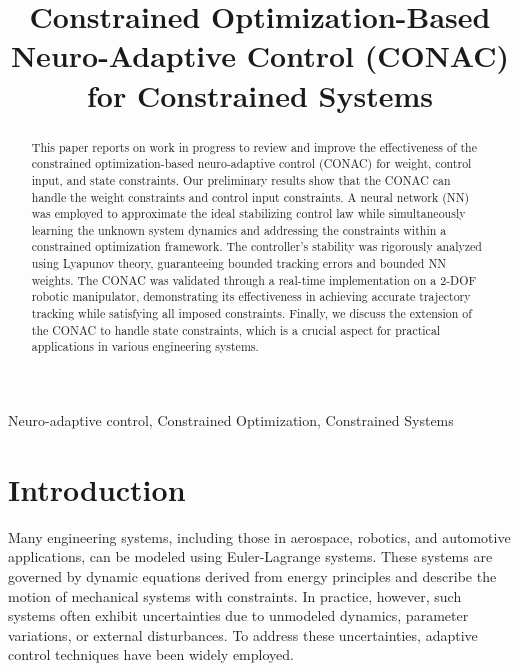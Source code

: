 \documentclass[conference]{IEEEtran}
\begin{document}
\title{\LARGE \bf
    Constrained Optimization-Based Neuro-Adaptive Control (CONAC) for Constrained Systems
}

\author{
    }


\maketitle
\thispagestyle{empty}

\begin{abstract}
    This paper reports on work in progress to review and improve the effectiveness of the constrained optimization-based neuro-adaptive control (CONAC) for weight, control input, and state constraints.
    Our preliminary results show that the CONAC can handle the weight constraints and control input constraints.
  A neural network (NN) was employed to approximate the ideal stabilizing control law while simultaneously learning the unknown system dynamics and addressing the constraints within a constrained optimization framework.
  The controller's stability was rigorously analyzed using Lyapunov theory, guaranteeing bounded tracking errors and bounded NN weights. 
  The CONAC was validated through a real-time implementation on a 2-DOF robotic manipulator, demonstrating its effectiveness in achieving accurate trajectory tracking while satisfying all imposed constraints.
  Finally, we discuss the extension of the CONAC to handle state constraints, which is a crucial aspect for practical applications in various engineering systems.
\end{abstract}
\begin{IEEEkeywords}
	Neuro-adaptive control, Constrained Optimization, Constrained Systems
\end{IEEEkeywords}


\section{Introduction}


Many engineering systems, including those in aerospace, robotics, and automotive applications, can be modeled using Euler-Lagrange systems. 
These systems are governed by dynamic equations derived from energy principles and describe the motion of mechanical systems with constraints. 
In practice, however, such systems often exhibit uncertainties due to unmodeled dynamics, parameter variations, or external disturbances. 
To address these uncertainties, adaptive control techniques have been widely employed.
\end{document}
